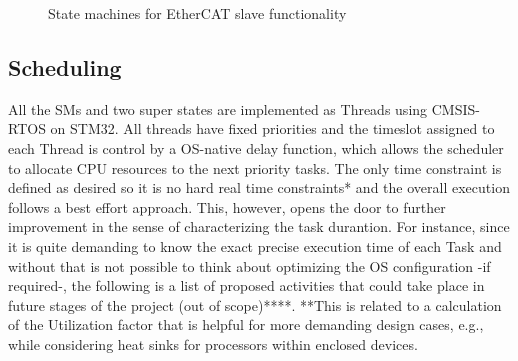 \begin{figure}[ht]
{{
  }}
  \caption{State machines for EtherCAT slave functionality} %
  \label{fig:soes_sms}
\end{figure} 

\subsection{Scheduling}
All the SMs and two super states are implemented as Threads using CMSIS-RTOS on STM32. All threads have fixed priorities and the timeslot assigned to each Thread is control by a OS-native delay function, which allows the scheduler to allocate CPU resources to the next priority tasks. The only time constraint is defined as desired so it is no hard real time constraints* and the overall execution follows a best effort approach. This, however, opens the door to further improvement in the sense of characterizing the task durantion. For instance, since it is quite demanding to know the exact precise execution time of each Task and without that is not possible to think about optimizing the OS configuration -if required-, the following is a list of proposed activities that could take place in future stages of the project (out of scope)****. **This is related to a calculation of the Utilization factor that is helpful for more demanding design cases, e.g., while considering heat sinks for processors within enclosed devices.

